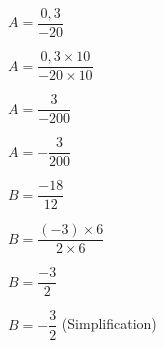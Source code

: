 \begin{exemples*1}
    \begin{multicols}{2}
        \begin{list}{}{}
            \item $A=\dfrac{0,3}{-20}$
            \item $A=\dfrac{0,3\times10}{-20\times10}$
            \item $A=\dfrac3{-200}$
            \item $A=-\dfrac3{200}$
            \columnbreak
            \item $B=\dfrac{-18}{12}$
            \item $B=\dfrac{(-3)\times6}{2\times6}$
            \item $B=\dfrac{-3}2$
            \item $B=-\dfrac32$ (Simplification)
        \end{list}
    \end{multicols}
\end{exemples*1}
